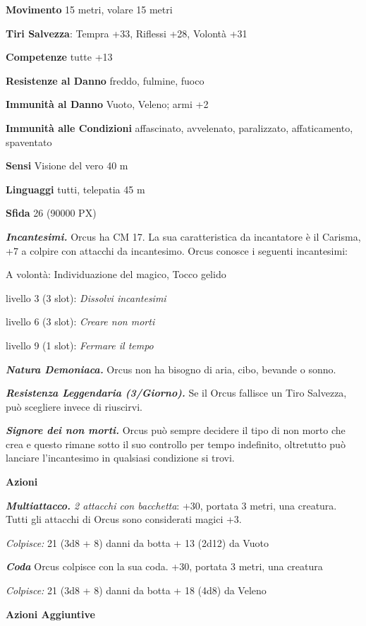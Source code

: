 \begin{multicols}{2}
	\textbf{Movimento} 15 metri, volare 15 metri

	\textbf{Tiri Salvezza}: Tempra +33, Riflessi +28, Volontà +31

	\textbf{Competenze} tutte +13

	\textbf{Resistenze al Danno} freddo, fulmine, fuoco

	\textbf{Immunità al Danno} Vuoto, Veleno; armi +2

	\textbf{Immunità alle Condizioni} affascinato, avvelenato, paralizzato, affaticamento, spaventato

	\textbf{Sensi} Visione del vero 40 m

	\textbf{Linguaggi} tutti, telepatia 45 m

	\textbf{Sfida} 26 (90000 PX)

	\textit{\textbf{Incantesimi.}} Orcus ha CM 17. La sua caratteristica da incantatore è il Carisma, +7 a colpire con attacchi da incantesimo. Orcus conosce i seguenti incantesimi:

	A volontà: Individuazione del magico, Tocco gelido

	livello 3 (3 slot): \textit{Dissolvi incantesimi}

	livello 6 (3 slot): \textit{Creare non morti}

	livello 9 (1 slot): \textit{Fermare il tempo}

	\textit{\textbf{Natura Demoniaca.}} Orcus non ha bisogno di aria, cibo, bevande o sonno.

	\textit{\textbf{Resistenza Leggendaria (3/Giorno).}} Se il Orcus fallisce un Tiro Salvezza, può scegliere invece di riuscirvi.

	\textit{\textbf{Signore dei non morti.}} Orcus può sempre decidere il tipo di non morto che crea e questo rimane sotto il suo controllo per tempo indefinito, oltretutto può lanciare l'incantesimo in qualsiasi condizione si trovi.

	\textbf{Azioni}

	\textit{\textbf{Multiattacco.} 2 attacchi con bacchetta}: +30, portata 3 metri, una creatura. Tutti gli attacchi di Orcus sono considerati magici +3.

	\textit{Colpisce:} 21 (3d8 + 8) danni da botta + 13 (2d12) da Vuoto

	\textit{\textbf{Coda}} Orcus colpisce con la sua coda. +30, portata 3 metri, una creatura

	\textit{Colpisce:} 21 (3d8 + 8) danni da botta + 18 (4d8) da Veleno

	\textbf{Azioni Aggiuntive}


\end{multicols}
